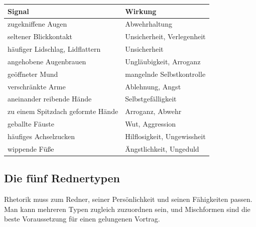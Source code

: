\documentclass[12pt, a4paper]{article}
\begin{document}
\begin{center}
\begin{tabular}{ll}
\textbf{Signal} & \textbf{Wirkung}\\\hline
zugekniffene Augen & Abwehrhaltung\\
seltener Blickkontakt & Unsicherheit, Verlegenheit\\
häufiger Lidschlag, Lidflattern & Unsicherheit\\
angehobene Augenbrauen & Ungläubigkeit, Arroganz\\
geöffneter Mund & mangelnde Selbstkontrolle\\
verschränkte Arme & Ablehnung, Angst\\
aneinander reibende Hände & Selbstgefälligkeit\\
zu einem Spitzdach geformte Hände & Arroganz, Abwehr\\
geballte Fäuste & Wut, Aggression\\
häufiges Achselzucken & Hilflosigkeit, Ungewissheit\\
wippende Füße & Ängstlichkeit, Ungeduld\\
\end{tabular}
\end{center}

\subsection{Die fünf Rednertypen}

Rhetorik muss zum Redner, seiner Persönlichkeit und seinen Fähigkeiten
passen. Man kann mehreren Typen zugleich zuzuordnen sein, und Mischformen
sind die beste Voraussetzung für einen gelungenen Vortrag.
\end{document}
